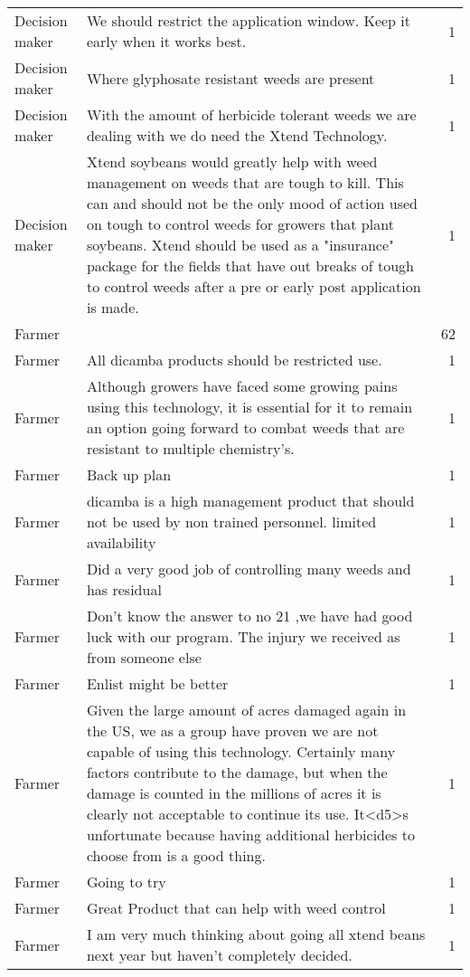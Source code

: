 \documentclass[]{article}
\begin{document}
\begin{table}[H]
\begin{tabular}{llr}
Decision maker & We should restrict the application window. Keep it early when it works best. & 1\\
Decision maker & Where glyphosate resistant weeds are present & 1\\
Decision maker & With the amount of herbicide tolerant weeds we are dealing with we do need the Xtend Technology. & 1\\
Decision maker & Xtend soybeans would greatly help with weed management on weeds that are tough to kill.  This can and should not be the only mood of action used on tough to control weeds for growers that plant soybeans.  Xtend should be used as a "insurance"  package for the fields that have out breaks of tough to control weeds after a pre or early post application is made. & 1\\
\addlinespace
Farmer &  & 62\\
Farmer & All dicamba products should be restricted use. & 1\\
Farmer & Although growers have faced some growing pains using this technology, it is essential for it to remain an option going forward to combat weeds that are resistant to multiple chemistry's. & 1\\
Farmer & Back up plan & 1\\
Farmer & dicamba is a high management product  that should not be used by non trained personnel.  limited availability & 1\\
\addlinespace
Farmer & Did a very good job of controlling many weeds and has residual & 1\\
Farmer & Don't know the answer to no 21  ,we have had good luck with our program. The injury we received as from someone else & 1\\
Farmer & Enlist might be better & 1\\
Farmer & Given the large amount of acres damaged again in the US, we as a group have proven we are not capable of using this technology.  Certainly many factors contribute to the damage, but when the damage is counted in the millions of acres it is clearly not acceptable to continue its use.  It<d5>s unfortunate because having additional herbicides to choose from is a good thing. & 1\\
Farmer & Going to try & 1\\
\addlinespace
Farmer & Great Product that can help with weed control & 1\\
Farmer & I am very much thinking about going all xtend beans next year but haven't completely decided. & 1\\

\end{tabular}
\end{table}
\end{document}
